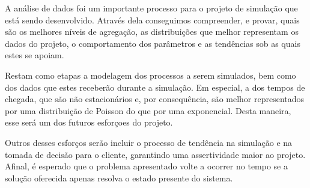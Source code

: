 A análise de dados foi um importante processo para o projeto de simulação que está sendo desenvolvido. Através dela conseguimos compreender, e provar, quais são os melhores níveis de agregação, as distribuições que melhor representam os dados do projeto, o comportamento dos parâmetros e as tendências sob as quais estes se apoiam.

Restam como etapas a modelagem dos processos a serem simulados, bem como dos dados que estes receberão durante a simulação. Em especial, a dos tempos de chegada, que são não estacionários e, por consequência, são melhor representados por uma distribuição de Poisson do que por uma exponencial. Desta maneira, esse será um dos futuros esforçoes do projeto.

Outros desses esforços serão incluir o processo de tendência na simulação e na tomada de decisão para o cliente, garantindo uma assertividade maior ao projeto. Afinal, é esperado que o problema apresentado volte a ocorrer no tempo se a solução oferecida apenas resolva o estado presente do sistema.